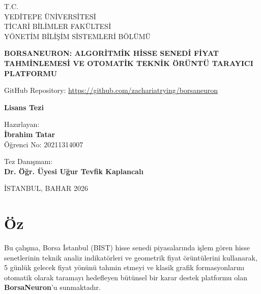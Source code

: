 \documentclass[12pt,a4paper]{report}
\begin{document}
\begin{titlepage}
    \begin{center}
        \large
        T.C. \\
        YEDİTEPE ÜNİVERSİTESİ \\
        TİCARİ BİLİMLER FAKÜLTESİ \\
        YÖNETİM BİLİŞİM SİSTEMLERİ BÖLÜMÜ \\
        
        \vspace*{2cm}
        
        \Huge
        \textbf{BORSANEURON: ALGORİTMİK HİSSE SENEDİ FİYAT TAHMİNLEMESİ VE OTOMATİK TEKNİK ÖRÜNTÜ TARAYICI PLATFORMU} \\
        
        \vspace*{1.5cm}
        
        \large
        GitHub Repository: \href{https://github.com/zachariatrying/borsaneuron}{https://github.com/zachariatrying/borsaneuron} \\
        
        \vspace*{2cm}
        
        \Large
        \textbf{Lisans Tezi} \\
        
        \vspace*{1cm}
        
        \large
        Hazırlayan: \\
        \textbf{İbrahim Tatar} \\
        Öğrenci No: 20211314007 \\
        
        \vspace*{1.5cm}
        
        Tez Danışmanı: \\
        \textbf{Dr. Öğr. Üyesi Uğur Tevfik Kaplancalı} \\
        
        \vfill
        
        \large
        İSTANBUL, BAHAR 2026
    \end{center}
\end{titlepage}


\chapter*{Öz}
Bu çalışma, Borsa İstanbul (BIST) hisse senedi piyasalarında işlem gören hisse senetlerinin teknik analiz indikatörleri ve geometrik fiyat örüntülerini kullanarak, 5 günlük gelecek fiyat yönünü tahmin etmeyi ve klasik grafik formasyonlarını otomatik olarak taramayı hedefleyen bütünsel bir karar destek platformu olan \textbf{BorsaNeuron}'u sunmaktadır. 
\end{document}
